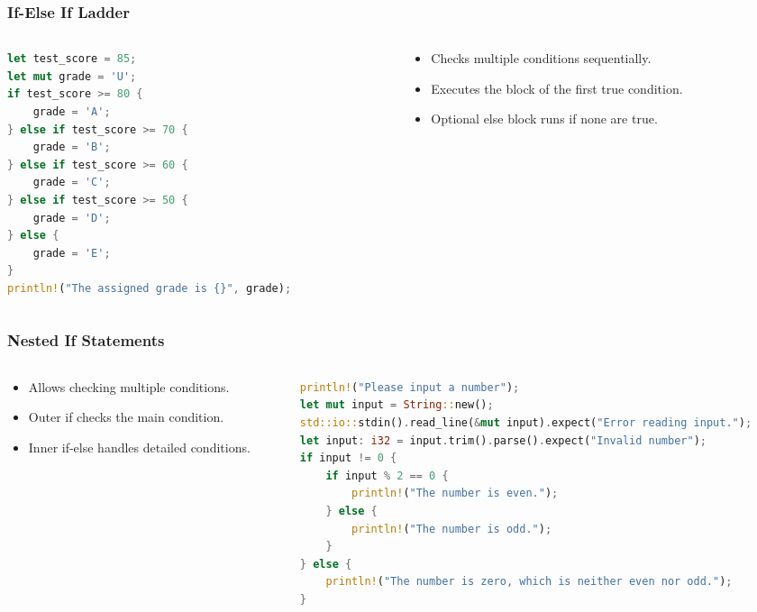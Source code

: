 \documentclass[aspectratio=169, table]{beamer}
\begin{document}
\begin{frame}[fragile]
\frametitle{If-Else If Ladder}
\vspace{25pt}
\begin{columns}[t,onlytextwidth]
\begin{column}{0.7\textwidth}
\begin{lstlisting}[language=Rust]
let test_score = 85;
let mut grade = 'U';
if test_score >= 80 {
	grade = 'A';
} else if test_score >= 70 {
	grade = 'B';
} else if test_score >= 60 {
	grade = 'C';
} else if test_score >= 50 {
	grade = 'D';
} else {
	grade = 'E';
}
println!("The assigned grade is {}", grade);
\end{lstlisting}
\end{column}
\begin{column}{0.3\textwidth}
\begin{itemize}
\item Checks multiple conditions sequentially.
\item Executes the block of the first true condition.
\item Optional else block runs if none are true.
\end{itemize}
\end{column}
\end{columns}
\end{frame}


\begin{frame}[fragile]
\frametitle{Nested If Statements}
\vspace{25pt}
\begin{columns}[t]
\begin{column}{0.25\textwidth}
\begin{itemize}
\item Allows checking multiple conditions.
\item Outer if checks the main condition.
\item Inner if-else handles detailed conditions.
\end{itemize}
\end{column}
\begin{column}{0.75\textwidth}
\begin{lstlisting}[language=Rust]
println!("Please input a number"); 
let mut input = String::new();
std::io::stdin().read_line(&mut input).expect("Error reading input.");
let input: i32 = input.trim().parse().expect("Invalid number");
if input != 0 {
	if input % 2 == 0 {
		println!("The number is even.");
	} else {
		println!("The number is odd.");
	}  
} else {
	println!("The number is zero, which is neither even nor odd.");
}
\end{lstlisting}
\end{column}
\end{columns}
\end{frame}
\end{document}

